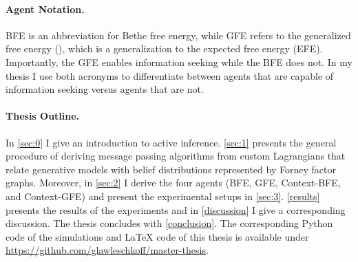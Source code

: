 \paragraph{Agent Notation.}
BFE is an abbreviation for Bethe free energy, while GFE refers to the generalized free energy (\cite{parr2019}), which is a generalization to the expected free energy (EFE). Importantly, the GFE enables information seeking while the BFE does not. In my thesis I use both acronyms to differentiate between agents that are capable of information seeking versus agents that are not.

\paragraph{Thesis Outline.}
In \cref{sec:0} I give an introduction to active inference. \cref{sec:1} presents the general procedure of deriving message passing algorithms from custom Lagrangians that relate generative models with belief distributions represented by Forney factor graphs. Moreover, in \cref{sec:2} I derive the four agents (BFE, GFE, Context-BFE, and Context-GFE) and present the experimental setups in \cref{sec:3}. \cref{results} presents the results of the experiments and in \cref{discussion} I give a corresponding discussion. The thesis concludes with \cref{conclusion}. The corresponding Python code of the simulations and LaTeX code of this thesis is available under \url{https://github.com/glawleschkoff/master-thesis}.